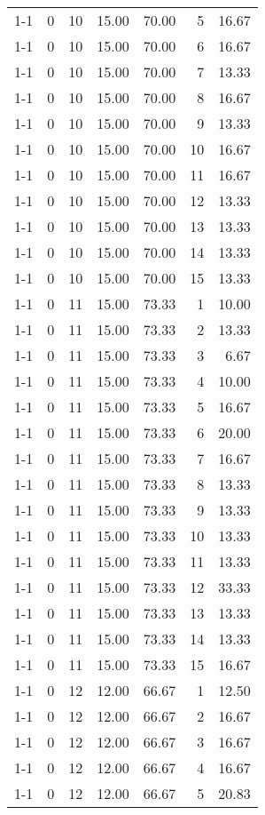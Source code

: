 \begin{tabular}{lrrrrrr}
1-1 & 0 & 10 & 15.00 & 70.00 & 5 & 16.67 \\
1-1 & 0 & 10 & 15.00 & 70.00 & 6 & 16.67 \\
1-1 & 0 & 10 & 15.00 & 70.00 & 7 & 13.33 \\
1-1 & 0 & 10 & 15.00 & 70.00 & 8 & 16.67 \\
1-1 & 0 & 10 & 15.00 & 70.00 & 9 & 13.33 \\
1-1 & 0 & 10 & 15.00 & 70.00 & 10 & 16.67 \\
1-1 & 0 & 10 & 15.00 & 70.00 & 11 & 16.67 \\
1-1 & 0 & 10 & 15.00 & 70.00 & 12 & 13.33 \\
1-1 & 0 & 10 & 15.00 & 70.00 & 13 & 13.33 \\
1-1 & 0 & 10 & 15.00 & 70.00 & 14 & 13.33 \\
1-1 & 0 & 10 & 15.00 & 70.00 & 15 & 13.33 \\
1-1 & 0 & 11 & 15.00 & 73.33 & 1 & 10.00 \\
1-1 & 0 & 11 & 15.00 & 73.33 & 2 & 13.33 \\
1-1 & 0 & 11 & 15.00 & 73.33 & 3 & 6.67 \\
1-1 & 0 & 11 & 15.00 & 73.33 & 4 & 10.00 \\
1-1 & 0 & 11 & 15.00 & 73.33 & 5 & 16.67 \\
1-1 & 0 & 11 & 15.00 & 73.33 & 6 & 20.00 \\
1-1 & 0 & 11 & 15.00 & 73.33 & 7 & 16.67 \\
1-1 & 0 & 11 & 15.00 & 73.33 & 8 & 13.33 \\
1-1 & 0 & 11 & 15.00 & 73.33 & 9 & 13.33 \\
1-1 & 0 & 11 & 15.00 & 73.33 & 10 & 13.33 \\
1-1 & 0 & 11 & 15.00 & 73.33 & 11 & 13.33 \\
1-1 & 0 & 11 & 15.00 & 73.33 & 12 & 33.33 \\
1-1 & 0 & 11 & 15.00 & 73.33 & 13 & 13.33 \\
1-1 & 0 & 11 & 15.00 & 73.33 & 14 & 13.33 \\
1-1 & 0 & 11 & 15.00 & 73.33 & 15 & 16.67 \\
1-1 & 0 & 12 & 12.00 & 66.67 & 1 & 12.50 \\
1-1 & 0 & 12 & 12.00 & 66.67 & 2 & 16.67 \\
1-1 & 0 & 12 & 12.00 & 66.67 & 3 & 16.67 \\
1-1 & 0 & 12 & 12.00 & 66.67 & 4 & 16.67 \\
1-1 & 0 & 12 & 12.00 & 66.67 & 5 & 20.83 \\

\end{tabular}
